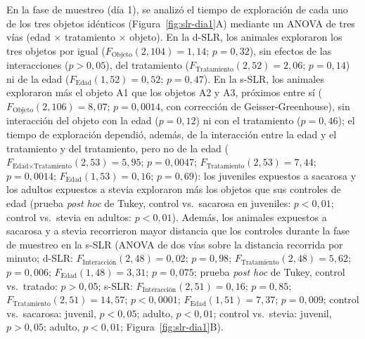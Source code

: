 \label{sec:res-slr-exploracion}En la fase de muestreo (día 1), se analizó el tiempo de exploración de cada uno de los tres objetos idénticos (Figura~\ref{fig:slr-dia1}A) mediante un ANOVA de tres vías (edad $\times$ tratamiento $\times$ objeto). En la d-SLR, los animales exploraron los tres objetos por igual ($F_{\text{Objeto}}(2, 104) = 1{,}14$; $p = 0{,}32$), sin efectos de las interacciones ($p > 0{,}05$), del tratamiento ($F_{\text{Tratamiento}}(2, 52) = 2{,}06$; $p = 0{,}14$) ni de la edad ($F_{\text{Edad}}(1, 52) = 0{,}52$; $p = 0{,}47$). En la s-SLR, los animales exploraron más el objeto A1 que los objetos A2 y A3, próximos entre sí ($F_{\text{Objeto}}(2, 106) = 8{,}07$; $p = 0{,}0014$, con corrección de Geisser-Greenhouse), sin interacción del objeto con la edad ($p = 0{,}12$) ni con el tratamiento ($p = 0{,}46$); el tiempo de exploración dependió, además, de la interacción entre la edad y el tratamiento y del tratamiento, pero no de la edad ($F_{\text{Edad} \times \text{Tratamiento}}(2, 53) = 5{,}95$; $p = 0{,}0047$; $F_{\text{Tratamiento}}(2, 53) = 7{,}44$; $p = 0{,}0014$; $F_{\text{Edad}}(1, 53) = 0{,}16$; $p = 0{,}69$): los juveniles expuestos a sacarosa y los adultos expuestos a stevia exploraron más los objetos que sus controles de edad (prueba \textit{post hoc} de Tukey, control vs.\ sacarosa en juveniles: $p < 0{,}01$; control vs.\ stevia en adultos: $p < 0{,}01$). Además, los animales expuestos a sacarosa y a stevia recorrieron mayor distancia que los controles durante la fase de muestreo en la s-SLR (ANOVA de dos vías sobre la distancia recorrida por minuto; d-SLR: $F_{\text{Interacción}}(2, 48) = 0{,}02$; $p = 0{,}98$; $F_{\text{Tratamiento}}(2, 48) = 5{,}62$; $p = 0{,}006$; $F_{\text{Edad}}(1, 48) = 3{,}31$; $p = 0{,}075$; prueba \textit{post hoc} de Tukey, control vs.\ tratado: $p > 0{,}05$; s-SLR: $F_{\text{Interacción}}(2, 51) = 0{,}16$; $p = 0{,}85$; $F_{\text{Tratamiento}}(2, 51) = 14{,}57$; $p < 0{,}0001$; $F_{\text{Edad}}(1, 51) = 7{,}37$; $p = 0{,}009$; control vs.\ sacarosa: juvenil, $p < 0{,}05$; adulto, $p < 0{,}01$; control vs.\ stevia: juvenil, $p > 0{,}05$; adulto, $p < 0{,}01$; Figura~\ref{fig:slr-dia1}B).

